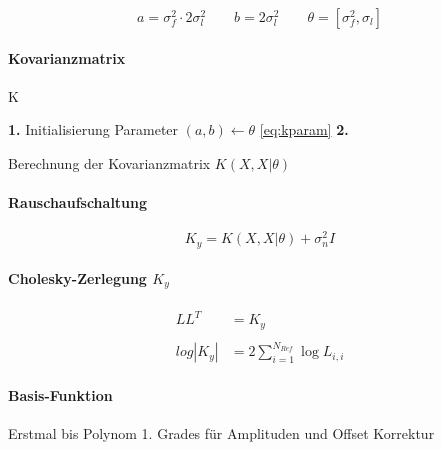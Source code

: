 \begin{equation}\label{eq:kparam}
	a = \sigma_f^2 \cdot 2 \sigma_l^2 \qquad b = 2 \sigma_l^2 \qquad \theta = \left[\sigma_f^2, \sigma_l\right]
\end{equation}


\paragraph*{Kovarianzmatrix}
K

\begin{algorithm}[h]
	\SetAlgoLined
	\textbf{1.} Initialisierung Parameter $(a,b) \leftarrow \theta$ \autoref{eq:kparam}\;
	\textbf{2.} 
	\caption{Berechnung der Kovarianzmatrix $K(X, X|\theta)$}
	\label{alg:kmatrix}
\end{algorithm}


\paragraph*{Rauschaufschaltung}


\begin{equation}\label{eq:addnoise}
	K_y = K(X, X|\theta) + \sigma_n^2 I
\end{equation}


\paragraph*{Cholesky-Zerlegung $K_y$}


\begin{align}\label{eq:chol}
		 LL^T &= K_y  \nonumber \\
		 \\
	log |K_y| &= 2 \sum_{i=1}^{N_{Ref}} \log L_{i,i} \nonumber
\end{align}


\paragraph*{Basis-Funktion}

Erstmal bis Polynom 1. Grades für Amplituden und Offset Korrektur

